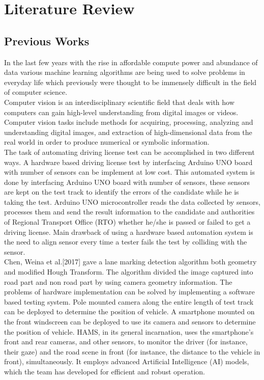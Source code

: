 \chapter{Literature Review}
\section{Previous Works}
In the last few years with the rise in affordable compute power and abundance of data various machine learning algorithms are being used to solve problems in everyday life which previously were thought to be immensely difficult in the field of computer science.
\\
Computer vision is an interdisciplinary scientific field that deals with how computers can gain high-level understanding from digital images or videos. Computer vision tasks include methods for acquiring, processing, analyzing and understanding digital images, and extraction of high-dimensional data from the real world in order to produce numerical or symbolic information.\\
The task of automating driving license test can be accomplished in two different ways. A hardware based driving license test by interfacing Arduino UNO board with number of sensors can be implement at low cost. This automated system is done by interfacing Arduino UNO board with number of sensors, these sensors are kept on the test track to identify the errors of the candidate while he is taking the test. Arduino UNO microcontroller reads the data collected by sensors, processes them and send the result information to the candidate and authorities of Regional Transport Office (RTO) whether he/she is passed or failed to get a driving license\cite{femto_anup}. Main drawback of using a hardware based automation system is the need to align sensor every time a tester fails the test by colliding with the sensor. 
\\
Chen, Weina et al.[2017] \cite{chen} gave a lane marking detection algorithm both geometry and modified Hough Transform. The algorithm divided the image captured into road part and non road part by using camera geometry information. 
The problems of hardware implementation can be solved by implementing a software based testing system. Pole mounted camera along the entire length of test track can be deployed to determine the position of vehicle. A smartphone mounted on the front windscreen can be deployed to use its camera and sensors to determine the position of vehicle.
HAMS, in its general incarnation, uses the smartphone’s front and rear cameras, and other sensors, to monitor the driver (for instance, their gaze) and the road scene in front (for instance, the distance to the vehicle in front), simultaneously. It employs advanced Artificial Intelligence (AI) models, which the team has developed for efficient and robust operation\cite{bordia2020automated}.


